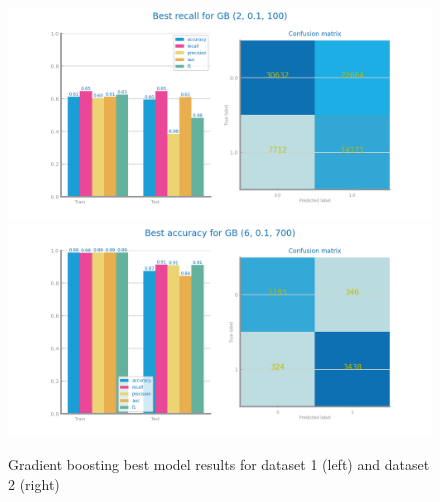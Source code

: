 \documentclass[10pt]{extarticle}
\begin{document}
\begin{figure}[H]
\centering\includegraphics[scale=0.4]{images/dataset1/models_evaluation/CovidPos_gb_GB_best_recall_eval.png}
\includegraphics[scale=0.4]{images/dataset2/models_evaluation/Credit_Score_gb_best_model_performance_accuracy.png}
\caption{Gradient boosting best model results for dataset 1 (left) and dataset 2 (right)}
\end{figure}
\end{document}

